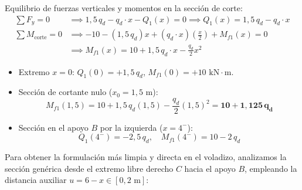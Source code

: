 Equilibrio de fuerzas verticales y momentos en la sección de corte:
\begin{align}
    \sum F_y = 0 & \implies 1{,}5\,q_d - q_d \cdot x - Q_1(x) = 0 \implies \boxed{Q_1(x) = 1{,}5\,q_d - q_d \cdot x} \\[6pt]
    \sum M_{\text{corte}} = 0 & \implies -10 - (1{,}5\,q_d)x + (q_d \cdot x)\left(\frac{x}{2}\right) + M_{f1}(x) = 0 \nonumber \\
    & \implies \boxed{M_{f1}(x) = 10 + 1{,}5\,q_d \cdot x - \frac{q_d}{2}x^2}
\end{align}
\begin{itemize}
    \item Extremo $x = 0$: $Q_1(0) = +1{,}5\,q_d$, $M_{f1}(0) = +10\text{ kN}\cdot\text{m}$.
    \item Sección de cortante nulo ($x_0 = 1{,}5\text{ m}$):
          \begin{equation}
              M_{f1}(1{,}5) = 10 + 1{,}5\,q_d(1{,}5) - \frac{q_d}{2}(1{,}5)^2 = \mathbf{10 + 1{,}125\,q_d}
          \end{equation}
    \item Sección en el apoyo $B$ por la izquierda ($x = 4^-$):
          \begin{equation}
              Q_1(4^-) = -2{,}5\,q_d, \quad M_{f1}(4^-) = 10 - 2\,q_d
          \end{equation}
\end{itemize}


Para obtener la formulación más limpia y directa en el voladizo, analizamos la sección genérica desde el extremo libre derecho $C$ hacia el apoyo $B$, empleando la distancia auxiliar $u = 6 - x \in [0, 2\text{ m}]$:

